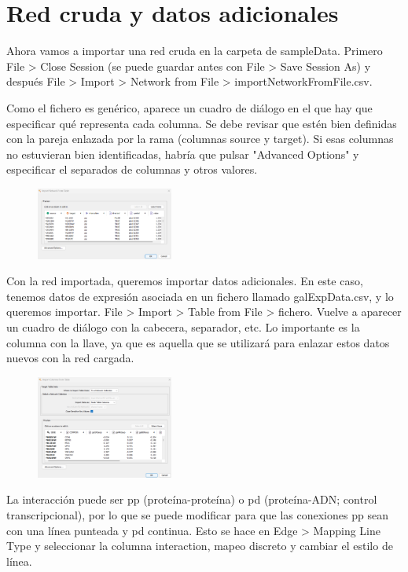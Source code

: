 \documentclass[nochap]{config/ejercicios}
\begin{document}
\section{Red cruda y datos adicionales}
Ahora vamos a importar una red cruda en la carpeta de sampleData. Primero File > Close Session (se puede guardar antes con File > Save Session As) y después File > Import > Network from File > importNetworkFromFile.csv. 

Como el fichero es genérico, aparece un cuadro de diálogo en el que hay que especificar qué representa cada columna. Se debe revisar que estén bien definidas con la pareja enlazada por la rama (columnas source y target). Si esas columnas no estuvieran bien identificadas, habría que pulsar "Advanced Options" y especificar el separados de columnas y otros valores. 

\begin{figure}[h]
\centering
\includegraphics[width = 0.4\textwidth]{figs/importtablefromfile.png}
\end{figure}

Con la red importada, queremos importar datos adicionales. En este caso, tenemos datos de expresión asociada en un fichero llamado galExpData.csv, y lo queremos importar. File > Import > Table from File > fichero. Vuelve a aparecer un cuadro de diálogo con la cabecera, separador, etc. Lo importante es la columna con la llave, ya que es aquella que se utilizará para enlazar estos datos nuevos con la red cargada. 

\begin{figure}[h]
\centering
\includegraphics[width = 0.4\textwidth]{figs/importcolumnsfromtable.png}
\end{figure}

La interacción puede ser pp (proteína-proteína) o pd (proteína-ADN; control transcripcional), por lo que se puede modificar para que las conexiones pp sean con una línea punteada y pd continua. Esto se hace en Edge > Mapping Line Type y seleccionar la columna interaction, mapeo discreto y cambiar el estilo de línea.
\end{document}

